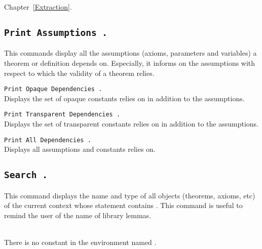 \SeeAlso Chapter~\ref{Extraction}.

\subsection[\tt Print Assumptions {\qualid}.]{\tt Print Assumptions {\qualid}.}
\label{PrintAssumptions}

This commands display all the assumptions (axioms, parameters and
variables) a theorem or definition depends on.  Especially, it informs
on the assumptions with respect to which the validity of a theorem
relies.

\begin{Variants}
\item \texttt{\tt Print Opaque Dependencies {\qualid}.
  }\\
  Displays the set of opaque constants {\qualid} relies on in addition
  to the assumptions.
\item \texttt{\tt Print Transparent Dependencies {\qualid}.
  }\\
  Displays the set of transparent constants {\qualid} relies on in addition
  to the assumptions.
\item \texttt{\tt Print All Dependencies {\qualid}.
  }\\
  Displays all assumptions and constants {\qualid} relies on.
\end{Variants}

\subsection[\tt Search {\qualid}.]{\tt Search {\qualid}.}
This command displays the name and type of all objects (theorems,
axioms, etc) of the current context whose statement contains \qualid.
This command is useful to remind the user of the name of library
lemmas.

\begin{ErrMsgs}
\item {}\\
    There is no constant in the environment named \qualid.
\end{ErrMsgs}

\newcommand{\termpatternorstr}{{\termpattern}\textrm{\textsl{-}}{\str}}

